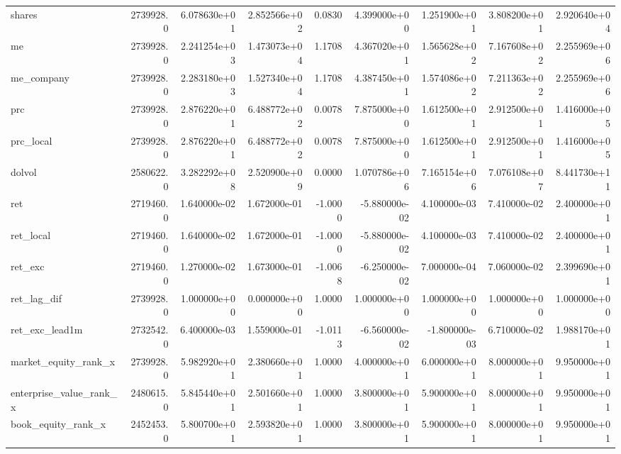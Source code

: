 \documentclass[12pt]{article}
\begin{document}
\begin{landscape}
\begin{longtable}{|l|r|r|r|r|r|r|r|r|}
shares                  &  2739928.0 &  6.078630e+01 &  2.852566e+02 &      0.0830 &  4.399000e+00 &  1.251900e+01 &  3.808200e+01 &  2.920640e+04 \\
me                      &  2739928.0 &  2.241254e+03 &  1.473073e+04 &      1.1708 &  4.367020e+01 &  1.565628e+02 &  7.167608e+02 &  2.255969e+06 \\
me\_company              &  2739928.0 &  2.283180e+03 &  1.527340e+04 &      1.1708 &  4.387450e+01 &  1.574086e+02 &  7.211363e+02 &  2.255969e+06 \\
prc                     &  2739928.0 &  2.876220e+01 &  6.488772e+02 &      0.0078 &  7.875000e+00 &  1.612500e+01 &  2.912500e+01 &  1.416000e+05 \\
prc\_local               &  2739928.0 &  2.876220e+01 &  6.488772e+02 &      0.0078 &  7.875000e+00 &  1.612500e+01 &  2.912500e+01 &  1.416000e+05 \\
dolvol                  &  2580622.0 &  3.282292e+08 &  2.520900e+09 &      0.0000 &  1.070786e+06 &  7.165154e+06 &  7.076108e+07 &  8.441730e+11 \\
ret                     &  2719460.0 &  1.640000e-02 &  1.672000e-01 &     -1.0000 & -5.880000e-02 &  4.100000e-03 &  7.410000e-02 &  2.400000e+01 \\
ret\_local               &  2719460.0 &  1.640000e-02 &  1.672000e-01 &     -1.0000 & -5.880000e-02 &  4.100000e-03 &  7.410000e-02 &  2.400000e+01 \\
ret\_exc                 &  2719460.0 &  1.270000e-02 &  1.673000e-01 &     -1.0068 & -6.250000e-02 &  7.000000e-04 &  7.060000e-02 &  2.399690e+01 \\
ret\_lag\_dif             &  2739928.0 &  1.000000e+00 &  0.000000e+00 &      1.0000 &  1.000000e+00 &  1.000000e+00 &  1.000000e+00 &  1.000000e+00 \\
ret\_exc\_lead1m          &  2732542.0 &  6.400000e-03 &  1.559000e-01 &     -1.0113 & -6.560000e-02 & -1.800000e-03 &  6.710000e-02 &  1.988170e+01 \\
market\_equity\_rank\_x    &  2739928.0 &  5.982920e+01 &  2.380660e+01 &      1.0000 &  4.000000e+01 &  6.000000e+01 &  8.000000e+01 &  9.950000e+01 \\
enterprise\_value\_rank\_x &  2480615.0 &  5.845440e+01 &  2.501660e+01 &      1.0000 &  3.800000e+01 &  5.900000e+01 &  8.000000e+01 &  9.950000e+01 \\
book\_equity\_rank\_x      &  2452453.0 &  5.800700e+01 &  2.593820e+01 &      1.0000 &  3.800000e+01 &  5.900000e+01 &  8.000000e+01 &  9.950000e+01 \\

\end{longtable}
\end{landscape}
\end{document}

